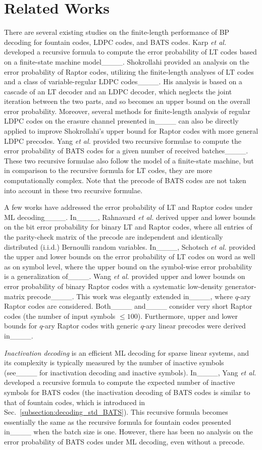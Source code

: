 \section{Related Works}
There are several existing studies on the finite-length performance of BP decoding for fountain codes, LDPC codes, and BATS codes. Karp \textit{et al.} developed a recursive formula to compute the error probability of LT codes based on a finite-state machine model____. Shokrollahi provided an analysis on the error probability of Raptor codes, utilizing the finite-length analyses of LT codes and a class of variable-regular LDPC codes____. His analysis is based on a cascade of an LT decoder and an LDPC decoder, which neglects the joint iteration between the two parts, and so becomes an upper bound on the overall error probability. Moreover, several methods for finite-length analysis of regular LDPC codes on the erasure channel presented in____ can also be directly applied to improve Shokrollahi's upper bound for Raptor codes with more general LDPC precodes. Yang \textit{et al.} provided two recursive formulae to compute the error probability of BATS codes for a given number of received batches____. These two recursive formulae also follow the model of a finite-state machine, but in comparison to the recursive formula for LT codes, they are more computationally complex. Note that the precode of BATS codes are not taken into account in these two recursive formulae.

A few works have addressed the error probability of LT and Raptor codes under ML decoding____. In____, Rahnavard \textit{et al.} derived upper and lower bounds on the bit error probability for binary LT and Raptor codes, where all entries of the parity-check matrix of the precode are independent and identically distributed (i.i.d.) Bernoulli random variables. In____, Schotsch \textit{et al.} provided the upper and lower bounds on the error probability of LT codes on word as well as on symbol level, where the upper bound on the symbol-wise error probability is a generalization of____. Wang \textit{et al.} provided upper and lower bounds on error probability of binary Raptor codes with a systematic low-density
generator-matrix precode____. This work was elegantly extended in____, where $q$-ary Raptor codes are considered. Both____ and____ consider very short Raptor codes (the number of input symbols $\le 100$). Furthermore, upper and lower bounds for $q$-ary Raptor codes with generic $q$-ary linear precodes were derived in____. 

\textit{Inactivation decoding} is an efficient ML decoding for sparse linear systems, and its complexity is typically measured by the number of inactive symbols (see____ for inactivation decoding and inactive symbols). In____, Yang \textit{et al.} developed a recursive formula to compute the expected number of inactive symbols for BATS codes (the inactivation decoding of BATS codes is similar to that of fountain codes, which is introduced in Sec.~\ref{subsection:decoding_std_BATS}). This recursive formula becomes essentially the same as the recursive formula for fountain codes presented in____ when the batch size is one. However, there has been no analysis on the error probability of BATS codes under ML decoding, even without a precode.